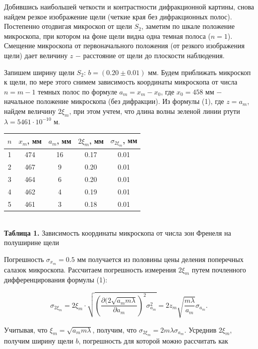 \documentclass[a4paper,12pt]{article} %
\begin{document}
\hfill \break Добившись наибольшей четкости и контрастности дифракционной картины, снова найдем резкое изображение щели (четкие края без дифракционных полос). Постепенно отодвигая микроскоп от щели $S_2$, заметим по шкале положение микроскопа, при котором на фоне щели видна одна темная полоса ($n = 1$). Смещение микроскопа от первоначального положения (от резкого изображения щели) дает величину $z$ $-$ расстояние от щели до плоскости наблюдения. 

\hfill \break Запишем ширину щели $S_2$: $b = (0.20 \pm 0.01)$ мм. Будем приближать микроскоп к щели, по мере этого снимем зависимость координаты микроскопа от числа $n = m - 1$ темных полос по формуле $a_{m} = x_{m} - x_{0}$, где  $x_{0} = 458$ мм $-$ начальное положение микроскопа (без дифракции). Из формулы (1), где $z = a_{m}$, найдем величину $2\xi_{m}$, при этом учтем, что длина волны зеленой линии ртути $\lambda = 5461 \cdot 10^{-10}$ м.

\begin{center}
\begin{tabular}{|c|c|c|c|c|}\hline
$ n $ & $ x_{m} $, мм & $ a_{m} $, мм & $ 2\xi_{m} $, мм & $ \sigma_{2\xi_{m}} $, мм\\\hline
1 & 474 & 16 & 0.17 & 0.01 \\\hline
2 & 467 & 9 & 0.20 & 0.01 \\\hline
3 & 464 & 6 & 0.20 & 0.01 \\\hline
4 & 462 & 4 & 0.19 & 0.01 \\\hline
5 & 461 & 3 & 0.18 & 0.01 \\\hline
\end{tabular} \\
\hfill \break \textbf {Таблица 1.} Зависимость координаты микроскопа от числа зон Френеля на полуширине щели\\
\end{center}

\hfill \break Погрешность $\sigma_{x_m} = 0.5$ мм получается из половины цены деления поперечных салазок микроскопа. Рассчитаем погрешность измерения $2\xi_{m}$ путем почленного дифференцирования формулы (1):

$$
\sigma_{2\xi_m} = 2\xi_{m} \cdot \sqrt{ \left( \frac{ \partial (2 \sqrt{ a_{m}m \lambda} } { \partial a_{m}} \right)^2 \sigma_{a_m}^2 } = 2z_{m} \sqrt{ \frac{ m \lambda} {a_{m}} } \sigma_{a_{m}}.
$$

\hfill \break Учитывая, что $\xi_{m} = \sqrt{ a_{m} m\lambda}$, получим, что $\sigma_{2\xi_{m}} = 2m\lambda \sigma_{a_{m}}$. Усреднив $2\xi_{m}$, получим ширину щели $b$, погрешность для которой можно рассчитать как
\end{document}
